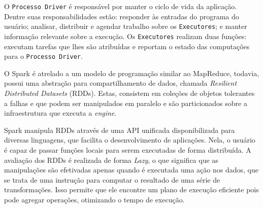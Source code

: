 O \texttt{Processo Driver} é responsável por manter o ciclo de vida da 
aplicação. Dentre suas responsabilidades estão: responder às entradas do 
programa do usuário; analisar, distribuir e agendar trabalho sobre os 
\texttt{Executores}; e manter informação relevante sobre a execução. Os 
\texttt{Executores} realizam duas funções: executam tarefas que lhes são 
atribuídas e reportam o estado das computações para o \texttt{Processo 
Driver}.

O Spark é atrelado a um modelo de programação similar ao MapReduce, todavia, 
possui uma abstração para compartilhamento de dados, chamada \textit{Resilient 
Distributed Datasets} (RDDs). Estas, consistem em coleções de objetos tolerantes 
a falhas e que podem ser manipulados em paralelo e são particionados sobre a 
infraestrutura que executa a \textit{engine}. 

Spark manipula RDDs através de uma API unificada disponibilizada para diversas 
linguagens, que facilita o desenvolvimento de aplicações. Nela, o usuário é 
capaz de passar funções locais para serem executadas de forma distribuída. A 
avaliação dos RDDs é realizada de forma \textit{Lazy}, o que significa que as 
manipulações são efetivadas apenas quando é executada uma ação nos dados, que 
se trata de uma instrução para computar o resultado de uma série de 
transformações. Isso permite que ele encontre um plano de execução eficiente 
pois pode agregar operações, otimizando o tempo de execução.





